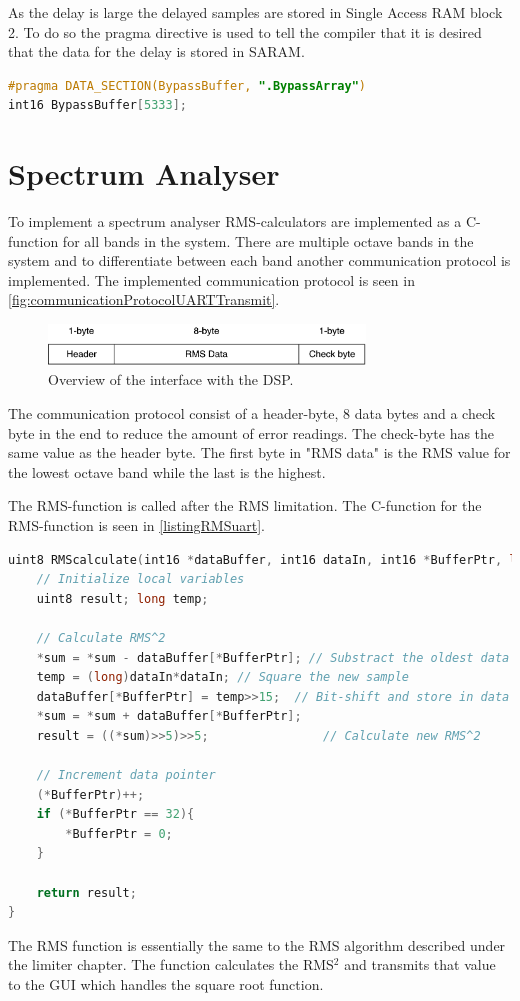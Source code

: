 As the delay is large the delayed samples are stored in Single Access RAM block 2. To do so the pragma directive is used to tell the compiler that it is desired that the data for the delay is stored in SARAM.

\begin{lstlisting}[language=C, caption = {Pragma for delay buffer for bypass.},label={listingPragma}]
#pragma DATA_SECTION(BypassBuffer, ".BypassArray")
int16 BypassBuffer[5333];
\end{lstlisting}


\section{Spectrum Analyser}

To implement a spectrum analyser RMS-calculators are implemented as a C-function for all bands in the system. There are multiple octave bands in the system and to differentiate between each band another communication protocol is implemented. The implemented communication protocol is seen in \autoref{fig:communicationProtocolUARTTransmit}.

\begin{figure}[H]
\centering
\includegraphics[width=0.75\textwidth]{figures/communicationProtocolUARTTransmit.pdf}
\caption{Overview of the interface with the DSP.}
\label{fig:communicationProtocolUARTTransmit}
\end{figure}

The communication protocol consist of a header-byte, 8 data bytes and a check byte in the end to reduce the amount of error readings. The check-byte has the same value as the header byte. The first byte in "RMS data" is the RMS value for the lowest octave band while the last is the highest.

The RMS-function is called after the RMS limitation. The C-function for the RMS-function is seen in \autoref{listingRMSuart}.

\begin{lstlisting}[language=C, caption = {Calculate RMS value},label={listingRMSuart}]
uint8 RMScalculate(int16 *dataBuffer, int16 dataIn, int16 *BufferPtr, long *sum){
	// Initialize local variables
	uint8 result; long temp;
	
	// Calculate RMS^2
	*sum = *sum - dataBuffer[*BufferPtr]; // Substract the oldest data from sum
	temp = (long)dataIn*dataIn;	// Square the new sample
	dataBuffer[*BufferPtr] = temp>>15;	// Bit-shift and store in data buffer
	*sum = *sum + dataBuffer[*BufferPtr];
	result = ((*sum)>>5)>>5;				// Calculate new RMS^2
	
	// Increment data pointer
	(*BufferPtr)++;
	if (*BufferPtr == 32){ 
		*BufferPtr = 0;
	}
	
	return result;
}
\end{lstlisting}

The RMS function is essentially the same to the RMS algorithm described under the limiter chapter. The function calculates the RMS$^2$ and transmits that value to the GUI which handles the square root function.


